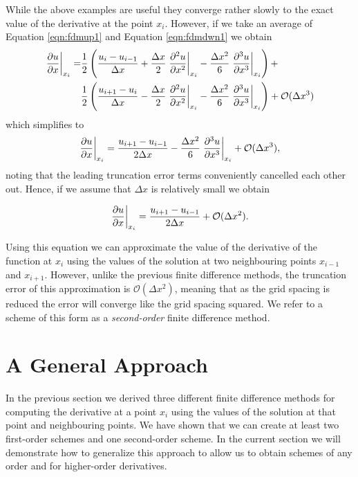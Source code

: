 While the above examples are useful they converge rather slowly to the exact value of the derivative at the point $x_i$. However, if we take an average of Equation \ref{eqn:fdmup1} and Equation \ref{eqn:fdmdwn1} we obtain
\begin{equation}
	\begin{aligned}
	\left.\frac{\partial u}{\partial x}\right\rvert_{x_i}^{} = &\frac{1}{2}\left(\frac{u_i - u_{i-1}}{\Delta x} + \frac{\Delta x}{2} \left.\frac{\partial^2 u}{\partial x^2}\right\rvert_{x_i}^{} - \frac{\Delta x^2}{6} \left.\frac{\partial^3 u}{\partial x^3}\right\rvert_{x_i}^{} \right) + \\
	& \frac{1}{2}\left(\frac{u_{i+1} - u_{i}}{\Delta x} - \frac{\Delta x}{2} \left.\frac{\partial^2 u}{\partial x^2}\right\rvert_{x_i}^{} - \frac{\Delta x^2}{6} \left.\frac{\partial^3 u}{\partial x^3}\right\rvert_{x_i}^{} \right) + \mathcal{O}(\Delta x^3)
	\end{aligned}
\end{equation}
which simplifies to
\begin{equation}
	\left.\frac{\partial u}{\partial x}\right\rvert_{x_i}^{} = \frac{u_{i+1} - u_{i-1}}{2 \Delta x} - \frac{\Delta x^2}{6} \left.\frac{\partial^3 u}{\partial x^3}\right\rvert_{x_i}^{} + \mathcal{O}(\Delta x^3),
\end{equation}
noting that the leading truncation error terms conveniently cancelled each other out. Hence, if we assume that $\Delta x$ is relatively small we obtain
\begin{eqBox}
\begin{equation}
	\left.\frac{\partial u}{\partial x}\right\rvert_{x_i}^{} = \frac{u_{i+1} - u_{i-1}}{2 \Delta x} + \mathcal{O}(\Delta x^2).
\end{equation}
\end{eqBox}
Using this equation we can approximate the value of the derivative of the function at $x_i$ using the values of the solution at two neighbouring points $x_{i-1}$ and $x_{i+1}$. However, unlike the previous finite difference methods, the truncation error of this approximation is $\mathcal{O}(\Delta x^2)$, meaning that as the grid spacing is reduced the error will converge like the grid spacing squared. We refer to a scheme of this form as a {\it second-order} finite difference method.

\section{A General Approach}
In the previous section we derived three different finite difference methods for computing the derivative at a point $x_i$ using the values of the solution at that point and neighbouring points. We have shown that we can create at least two first-order schemes and one second-order scheme. In the current section we will demonstrate how to generalize this approach to allow us to obtain schemes of any order and for higher-order derivatives.

